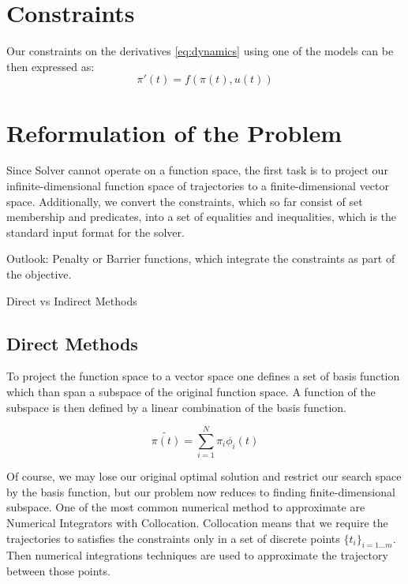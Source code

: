 \section{Constraints}

Our constraints on the derivatives \ref{eq:dynamics} using one of the models can be then expressed as:
\begin{equation}
	\pi'(t) = f(\pi(t), u(t))
\end{equation}

\section{Reformulation of the Problem}

Since Solver cannot operate on a function space, the first task is to project our infinite-dimensional function space of trajectories to a
finite-dimensional vector space.
Additionally, we convert the constraints, which so far consist of set membership and predicates, into a set of equalities and inequalities, which is
the standard input format for the solver.

Outlook: Penalty or Barrier functions, which integrate the constraints as part of the objective.

Direct vs Indirect Methods

\subsection{Direct Methods}

To project the function space to a vector space one
defines a set of basis function which than span a subspace of the original function space.
A function of the subspace is then defined by a linear combination of the basis function.

\begin{equation}
	\tilde{\pi(t)} = \sum_{i=1}^{N}\pi_i\phi_i(t)
\end{equation}

Of course, we may lose our original optimal solution and restrict our search space by the basis function, but our problem now reduces to finding
finite-dimensional subspace.
One of the most common numerical method to approximate are Numerical Integrators with Collocation.
Collocation means that we require the trajectories to satisfies the constraints only in a set of discrete points $\{t_i\}_{i=1\dots m}$.
Then numerical integrations techniques are used to approximate the trajectory between those points.


